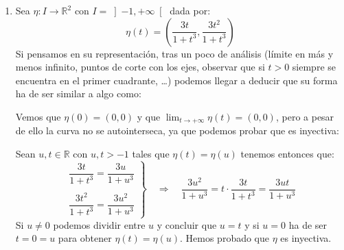 \begin{ejemplo}
\begin{enumerate}
            Observamos que:
            \begin{equation*}
                \zeta'(t) = -\sen\left(\frac{t}{r}\right)e_1 + \cos\left(\frac{t}{r}\right)e_2 \qquad \forall t\in \mathbb{R}
            \end{equation*}
            No es constante, por lo que no es un MRU. Además vemos que $\zeta''(t)$ no es constante, por lo que tampoco es un MRUA. Sin embargo, apreciamos que $|\zeta''(t)|$ sí que es constante, así como que $|\zeta'(t)| = 1$.

            Se trata de la traza de un Movimiento Circular Uniforme.
        \item Sea $\eta:I\to \mathbb{R}^2$ con $I = \left]-1,+\infty\right[$ dada por:
            \begin{equation*}
                \eta(t) = \left(\frac{3t}{1+t^3}, \frac{3t^2}{1+t^3}\right)
            \end{equation*}
            Si pensamos en su representación, tras un poco de análisis (límite en más y menos infinito, puntos de corte con los ejes, observar que si $t>0$ siempre se encuentra en el primer cuadrante, \ldots) podemos llegar a deducir que su forma ha de ser similar a algo como:
            \ifshowfigures
            \begin{figure}[H]
            \centering
            \end{figure}
            \fi

            \noindent
            Vemos que $\eta(0) = (0,0)$ y que $\lim_{t\to+\infty}\eta(t) = (0,0)$, pero a pesar de ello la curva no se autointerseca, ya que podemos probar que es inyectiva:

            \noindent
            Sean $u,t\in \mathbb{R}$ con $u,t>-1$ tales que $\eta(t) = \eta(u)$ tenemos entonces que:
            \begin{equation*}
                \left.\begin{array}{l}
                        \dfrac{3t}{1+t^3} = \dfrac{3u}{1+u^3} \\
                        \\
                        \dfrac{3t^2}{1+t^3} = \dfrac{3u^2}{1+u^3} 
                \end{array}\right\} \quad\Longrightarrow\quad \dfrac{3u^2}{1+u^3} = t\cdot \dfrac{3t}{1+t^3} = \dfrac{3ut}{1+u^3} 
            \end{equation*}
            Si $u\neq 0$ podemos dividir entre $u$ y concluir que $u=t$ y si $u=0$ ha de ser $t=0 =u$ para obtener $\eta(t) = \eta(u)$. Hemos probado que $\eta$ es inyectiva.


\end{enumerate}
\end{ejemplo}
